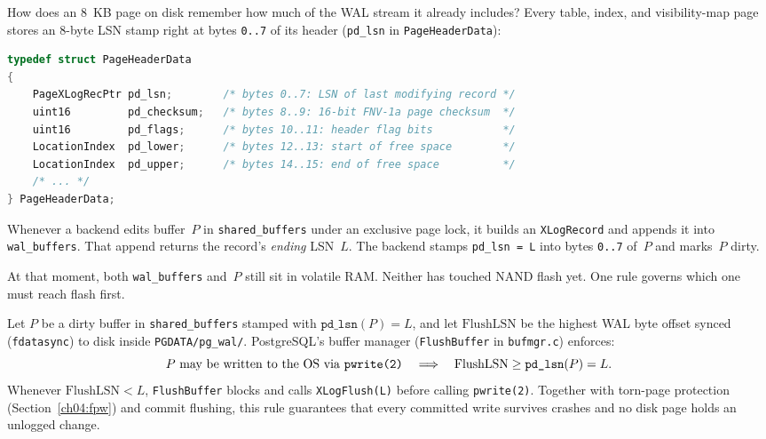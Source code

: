 How does an 8~KB page on disk remember how much of the WAL stream it already includes? Every table, index, and visibility-map page stores an 8-byte LSN stamp right at bytes \texttt{0..7} of its header (\texttt{pd\_lsn} in \texttt{PageHeaderData}):
\begin{lstlisting}[language=C]
typedef struct PageHeaderData
{
    PageXLogRecPtr pd_lsn;        /* bytes 0..7: LSN of last modifying record */
    uint16         pd_checksum;   /* bytes 8..9: 16-bit FNV-1a page checksum  */
    uint16         pd_flags;      /* bytes 10..11: header flag bits           */
    LocationIndex  pd_lower;      /* bytes 12..13: start of free space        */
    LocationIndex  pd_upper;      /* bytes 14..15: end of free space          */
    /* ... */
} PageHeaderData;
\end{lstlisting}
Whenever a backend edits buffer~$P$ in \texttt{shared\_buffers} under an exclusive page lock, it builds an \texttt{XLogRecord} and appends it into \texttt{wal\_buffers}. That append returns the record's \emph{ending} LSN~$L$. The backend stamps \texttt{pd\_lsn = L} into bytes \texttt{0..7} of~$P$ and marks~$P$ dirty.

At that moment, both \texttt{wal\_buffers} and~$P$ still sit in volatile RAM. Neither has touched NAND flash yet. One rule governs which one must reach flash first.

\begin{theorem}
\label{ch04:thm-wal-rule}
Let $P$ be a dirty buffer in \texttt{shared\_buffers} stamped with $\texttt{pd\_lsn}(P) = L$, and let $\mathrm{FlushLSN}$ be the highest WAL byte offset synced (\texttt{fdatasync}) to disk inside \texttt{PGDATA/pg\_wal/}. PostgreSQL's buffer manager (\texttt{FlushBuffer} in \texttt{bufmgr.c}) enforces:
\[
  P \text{ may be written to the OS via \texttt{pwrite(2)}} \quad\Longrightarrow\quad \mathrm{FlushLSN} \ge \texttt{pd\_lsn}(P) = L.
\]
Whenever $\mathrm{FlushLSN} < L$, \texttt{FlushBuffer} blocks and calls \texttt{XLogFlush(L)} before calling \texttt{pwrite(2)}. Together with torn-page protection (Section~\ref{ch04:fpw}) and commit flushing, this rule guarantees that every committed write survives crashes and no disk page holds an unlogged change.
\end{theorem}

